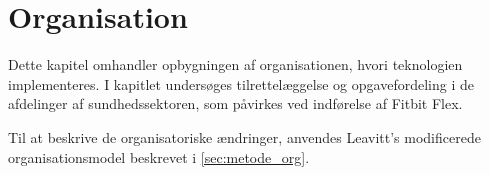\chapter{Organisation}
Dette kapitel omhandler opbygningen af organisationen, hvori teknologien implementeres. I kapitlet undersøges tilrettelæggelse og opgavefordeling i de afdelinger af sundhedssektoren, som påvirkes ved indførelse af Fitbit Flex. 


Til at beskrive de organisatoriske ændringer, anvendes Leavitt's modificerede organisationsmodel beskrevet i \autoref{sec:metode_org}.